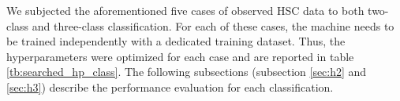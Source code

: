 \documentclass[proof]{pasj01}
\begin{document}
%
%
\begin{table}[htbp]
\label{tab:HSCsurvey_schedule}
\end{table}
%
%
We subjected the aforementioned five cases of observed HSC data to both two-class and three-class classification.
For each of these cases, the machine needs to be trained independently with a dedicated training dataset.
Thus, the hyperparameters were optimized for each case and are reported in table \ref{tb:searched_hp_class}.
The following subsections (subsection \ref{sec:h2} and \ref{sec:h3}) describe the performance evaluation for each classification.
%
%
\end{document}
